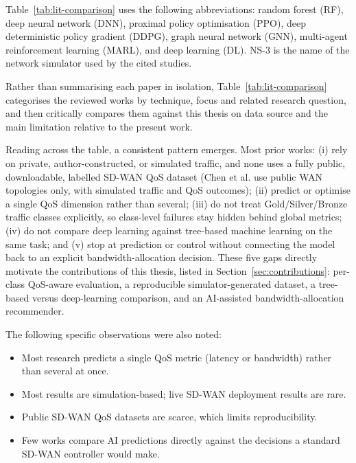 \documentclass[a4paper,12pt]{Classes/RoboticsLaTeX}
\begin{document}
Table~\ref{tab:lit-comparison} uses the following abbreviations: random forest (RF), deep neural network (DNN), proximal policy optimisation (PPO), deep deterministic policy gradient (DDPG), graph neural network (GNN), multi-agent reinforcement learning (MARL), and deep learning (DL). NS-3 is the name of the network simulator used by the cited studies.

Rather than summarising each paper in isolation, Table~\ref{tab:lit-comparison} categorises the reviewed works by technique, focus and related research question, and then critically compares them against this thesis on data source and the main limitation relative to the present work.

Reading across the table, a consistent pattern emerges. Most prior works: (i) rely on private, author-constructed, or simulated traffic, and none uses a fully public, downloadable, labelled SD-WAN QoS dataset (Chen et al. use public WAN topologies only, with simulated traffic and QoS outcomes); (ii) predict or optimise a single QoS dimension rather than several; (iii) do not treat Gold/Silver/Bronze traffic classes explicitly, so class-level failures stay hidden behind global metrics; (iv) do not compare deep learning against tree-based machine learning on the same task; and (v) stop at prediction or control without connecting the model back to an explicit bandwidth-allocation decision. These five gaps directly motivate the contributions of this thesis, listed in Section~\ref{sec:contributions}: per-class QoS-aware evaluation, a reproducible simulator-generated dataset, a tree-based versus deep-learning comparison, and an AI-assisted bandwidth-allocation recommender.

The following specific observations were also noted:
\begin{itemize}
    \item Most research predicts a single QoS metric (latency or bandwidth) rather than several at once.
    \item Most results are simulation-based; live SD-WAN deployment results are rare.
    \item Public SD-WAN QoS datasets are scarce, which limits reproducibility.
    \item Few works compare AI predictions directly against the decisions a standard SD-WAN controller would make.
\end{itemize}
\end{document}
